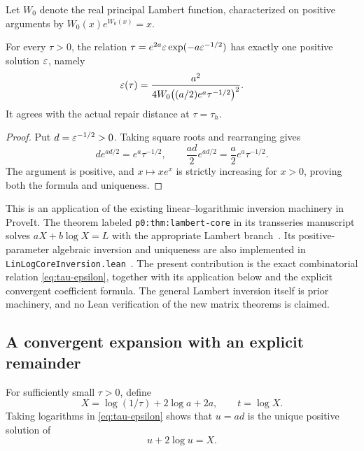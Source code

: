 Let \(W_0\) denote the real principal Lambert function,
characterized on positive arguments by \(W_0(x)e^{W_0(x)}=x\).
\begin{proposition}
\label{prop:lambert}
For every \(\tau>0\), the relation
\(\tau=e^{2a}\varepsilon\exp(-a\varepsilon^{-1/2})\) has exactly one positive
solution \(\varepsilon\), namely
\begin{equation}
 \varepsilon(\tau)=
 \frac{a^2}{4W_0\!\left((a/2)e^a\tau^{-1/2}\right)^2}.
 \label{eq:lambert-inverse}
\end{equation}
It agrees with the actual repair distance at \(\tau=\tau_h\).
\end{proposition}
\begin{proof}
Put \(d=\varepsilon^{-1/2}>0\). Taking square roots and rearranging gives
\[
 d e^{ad/2}=e^a\tau^{-1/2},\qquad
 \frac{ad}{2}e^{ad/2}=\frac a2e^a\tau^{-1/2}.
\]
The argument is positive, and \(x\mapsto xe^x\) is strictly
increasing for \(x>0\), proving both the formula and uniqueness.
\end{proof}

This is an application of the existing linear--logarithmic inversion
machinery in ProveIt. The theorem labeled \texttt{p0:thm:lambert-core}
in its transseries manuscript solves \(aX+b\log X=L\) with the
appropriate Lambert branch~\cite{ProveItLambert}. Its positive-parameter
algebraic inversion and uniqueness are also implemented in
\texttt{LinLogCoreInversion.lean}~\cite{ProveItLean}. The present
contribution is the exact combinatorial relation
\eqref{eq:tau-epsilon}, together with its application below and the
explicit convergent coefficient formula. The general Lambert inversion
itself is prior machinery, and no Lean verification of the new matrix
theorems is claimed.

\subsection{A convergent expansion with an explicit remainder}

For sufficiently small \(\tau>0\), define
\begin{equation}
 X=\log(1/\tau)+2\log a+2a,\qquad t=\log X.
 \label{eq:X-inverse}
\end{equation}
Taking logarithms in \eqref{eq:tau-epsilon} shows that
\(u=ad\) is the unique positive solution of
\begin{equation}
 u+2\log u=X.
 \label{eq:inverse-core}
\end{equation}

